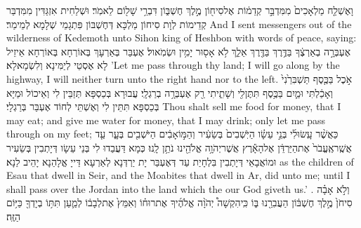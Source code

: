 {וָאֶשְׁלַ֤ח מַלְאָכִים֙ מִמִּדְבַּ֣ר קְדֵמ֔וֹת אֶל\maqqaf סִיח֖וֹן מֶ֣לֶךְ חֶשְׁבּ֑וֹן דִּבְרֵ֥י שָׁל֖וֹם לֵאמֹֽר׃}
{וּשְׁלַחִית אִזְגַּדִּין מִמִּדְבַּר קְדֵימוֹת לְוָת סִיחוֹן מַלְכָּא דְּחֶשְׁבּוֹן פִּתְגָמֵי שְׁלָמָא לְמֵימַר׃}
{And I sent messengers out of the wilderness of Kedemoth unto Sihon king of Heshbon with words of peace, saying:}{}
{אֶעְבְּרָ֣ה בְאַרְצֶ֔ךָ בַּדֶּ֥רֶךְ בַּדֶּ֖רֶךְ אֵלֵ֑ךְ לֹ֥א אָס֖וּר יָמִ֥ין וּשְׂמֹֽאול׃}
{אֶעְבַּר בְּאַרְעָךְ בְּאוֹרְחָא בְּאוֹרְחָא אֵיזֵיל לָא אֶסְטֵי לְיַמִּינָא וְלִשְׂמָאלָא׃}
{’Let me pass through thy land; I will go along by the highway, I will neither turn unto the right hand nor to the left.}{}
{אֹ֣כֶל בַּכֶּ֤סֶף תַּשְׁבִּרֵ֙נִי֙ וְאָכַ֔לְתִּי וּמַ֛יִם בַּכֶּ֥סֶף תִּתֶּן\maqqaf לִ֖י וְשָׁתִ֑יתִי רַ֖ק אֶעְבְּרָ֥ה בְרַגְלָֽי׃}
{עֲבוּרָא בְּכַסְפָּא תְּזַבֵּין לִי וְאֵיכוֹל וּמַיָּא בְּכַסְפָּא תִּתֵּין לִי וְאֶשְׁתֵּי לְחוֹד אֶעְבַּר בְּרַגְלָי׃}
{Thou shalt sell me food for money, that I may eat; and give me water for money, that I may drink; only let me pass through on my feet;}{}
{כַּאֲשֶׁ֨ר עָֽשׂוּ\maqqaf לִ֜י בְּנֵ֣י עֵשָׂ֗ו הַיֹּֽשְׁבִים֙ בְּשֵׂעִ֔יר וְהַמּ֣וֹאָבִ֔ים הַיֹּשְׁבִ֖ים בְּעָ֑ר עַ֤ד אֲשֶֽׁר\maqqaf אֶֽעֱבֹר֙ אֶת\maqqaf הַיַּרְדֵּ֔ן אֶל\maqqaf הָאָ֕רֶץ אֲשֶׁר\maqqaf יְהֹוָ֥ה אֱלֹהֵ֖ינוּ נֹתֵ֥ן לָֽנוּ׃}
{כְּמָא דַּעֲבַדוּ לִי בְּנֵי עֵשָׂו דְּיָתְבִין בְּשֵׂעִיר וּמוֹאֲבָאֵי דְּיָתְבִין בִּלְחָיַת עַד דְּאֶעְבַּר יָת יַרְדְּנָא לְאַרְעָא דַּייָ אֱלָהַנָא יָהֵיב לַנָא׃}
{as the children of Esau that dwell in Seir, and the Moabites that dwell in Ar, did unto me; until I shall pass over the Jordan into the land which the \lord\space our God giveth us.’ .}{}
{וְלֹ֣א אָבָ֗ה סִיחֹן֙ מֶ֣לֶךְ חֶשְׁבּ֔וֹן הַעֲבִרֵ֖נוּ בּ֑וֹ כִּֽי\maqqaf הִקְשָׁה֩ יְהֹוָ֨ה אֱלֹהֶ֜יךָ אֶת\maqqaf רוּח֗וֹ וְאִמֵּץ֙ אֶת\maqqaf לְבָב֔וֹ לְמַ֛עַן תִּתּ֥וֹ בְיָדְךָ֖ כַּיּ֥וֹם הַזֶּֽה׃ \setuma }
